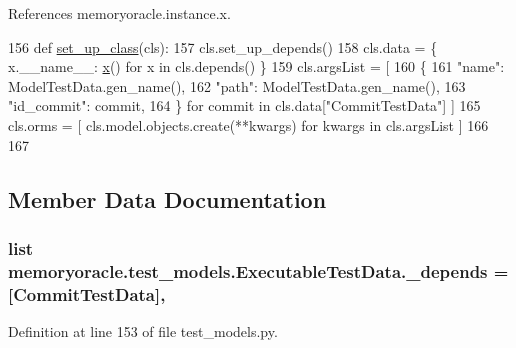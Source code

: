 References memoryoracle.\+instance.\+x.


\begin{DoxyCode}
156     \textcolor{keyword}{def }\hyperlink{classmemoryoracle_1_1test__models_1_1ExecutableTestData_a526f912c2e8eeddb64beb6241f138c09}{set\_up\_class}(cls):
157         cls.set\_up\_depends()
158         cls.data = \{ x.\_\_name\_\_: \hyperlink{namespacememoryoracle_1_1instance_afe036cc8dc71469743d090c4c80d50c5}{x}() \textcolor{keywordflow}{for} x \textcolor{keywordflow}{in} cls.depends() \}
159         cls.argsList = [
160                 \{
161                     \textcolor{stringliteral}{"name"}: ModelTestData.gen\_name(),
162                     \textcolor{stringliteral}{"path"}: ModelTestData.gen\_name(),
163                     \textcolor{stringliteral}{"id\_commit"}: commit,
164                 \} \textcolor{keywordflow}{for} commit \textcolor{keywordflow}{in} cls.data[\textcolor{stringliteral}{"CommitTestData"}] ]
165         cls.orms = [ cls.model.objects.create(**kwargs) \textcolor{keywordflow}{for} kwargs \textcolor{keywordflow}{in} cls.argsList ]
166 
167 
\end{DoxyCode}


\subsection{Member Data Documentation}
\hypertarget{classmemoryoracle_1_1test__models_1_1ExecutableTestData_a2558978df6fcc2cf6d1a9dadec3ed075}{}
\subsubsection[{\+\_\+depends}]{\setlength{\rightskip}{0pt plus 5cm}list memoryoracle.\+test\+\_\+models.\+Executable\+Test\+Data.\+\_\+depends = \mbox{[}{\bf Commit\+Test\+Data}\mbox{]}\hspace{0.3cm}{\ttfamily [static]}, {\ttfamily [private]}}\label{classmemoryoracle_1_1test__models_1_1ExecutableTestData_a2558978df6fcc2cf6d1a9dadec3ed075}


Definition at line 153 of file test\+\_\+models.\+py.

\hypertarget{classmemoryoracle_1_1test__models_1_1ExecutableTestData_a81ed1592e6042c61fe80728b55275bdc}{}
